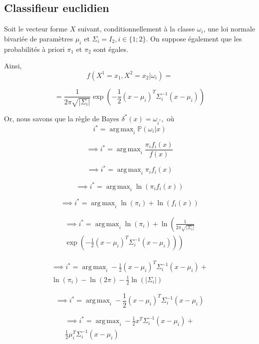 \documentclass{article}
\begin{document}
\begin{multicols}{2}
\subsection{Classifieur euclidien}
\label{app_subsec_bayes_eucl_classifier}
Soit le vecteur forme $X$ suivant, conditionnellement à la classe $\omega_i$, une loi normale bivariée de paramètres $\mu_i$ et $\Sigma_i = I_2 , i \in \{1 ; 2 \}$. On suppose également que les probabilités à priori $\pi_1$ et $\pi_2$ sont égales.

Ainsi,
\[
f(X^1 = x_1, X^2 = x_2 | \omega_i ) = 
\]

\[
= \frac{1}{2 \pi \sqrt{|\Sigma_i|}} \exp \left(-\frac{1}{2}(x - \mu_i)^T \Sigma_i^{-1} (x - \mu_i) \right) 
\]

Or, nous savons que la règle de Bayes $ \delta^{\ast}(x) = \omega_{i^{\ast}},$ où
\[
i^{\ast} =  \operatorname{arg\,max}_i \mathbb{P}(\omega_i | x)
\]

\[
\implies i^{\ast} =  \operatorname{arg\,max}_i \frac{\pi_i f_i(x) }{f(x)}
\]

\[
\implies i^{\ast} =  \operatorname{arg\,max}_i \pi_i f_i(x)
\]

\[
\implies i^{\ast} =  \operatorname{arg\,max}_i \ln(\pi_i f_i(x))
\]

\[
\implies i^{\ast} =  \operatorname{arg\,max}_i \ln(\pi_i) + \ln(f_i(x))
\]

\[
\begin{split}
\implies i^{\ast} =  \operatorname{arg\,max}_i \ln(\pi_i) + \ln \left(\frac{1}{2 \pi \sqrt{|\Sigma_i|}} \right. \\
\left. \exp \left(-\frac{1}{2}(x - \mu_i)^T \Sigma_i^{-1} (x - \mu_i) \right) \right)
\end{split}
\]

\[
\begin{split}
\implies i^{\ast} = \operatorname{arg\,max}_i -\frac{1}{2}(x - \mu_i)^T \Sigma_i^{-1}(x - \mu_i) + \\
\ln(\pi_i) - \ln(2 \pi) - \frac{1}{2} \ln(|\Sigma_i|)
\end{split}
\]

\[
\implies i^{\ast} = \operatorname{arg\,max}_i -\frac{1}{2}(x - \mu_i)^T \Sigma_i^{-1}(x - \mu_i)
\]

\[
\begin{split}
\implies i^{\ast} = \operatorname{arg\,max}_i  -\frac{1}{2}x^T \Sigma_i^{-1} (x - \mu_i) + \\
\frac{1}{2}\mu_i^T \Sigma_i^{-1} (x - \mu_i) 
\end{split}
\]


\end{multicols}
\end{document}

